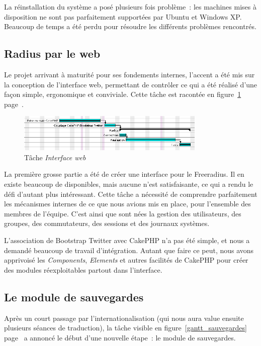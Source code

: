 La réinstallation du système a posé plusieurs fois problème~: les machines mises à disposition ne sont pas parfaitement supportées par Ubuntu et Windows XP. Beaucoup de temps a été perdu pour résoudre les différents problèmes rencontrés.

\subsection{Radius par le web}

Le projet arrivant à maturité pour ses fondements internes, l'accent a été mis sur la conception de l'interface web, permettant de contrôler ce qui a été réalisé d'une façon simple, ergonomique et conviviale. Cette tâche est racontée en figure~\ref{gantt_cake} page~\pageref{gantt_cake}.

\begin{figure}[!h]
	\begin{center}
		\includegraphics[width=0.8\textwidth]{img/gantt_cake.png}
	\end{center}
	\caption{Tâche \textit{Interface web}}
	\label{gantt_cake}
\end{figure}

La première grosse partie a été de créer une interface pour le Freeradius. Il en existe beaucoup de disponibles, mais aucune n'est satisfaisante, ce qui a rendu le défi d'autant plus intéressant. Cette tâche a nécessité de comprendre parfaitement les mécanismes internes de ce que nous avions mis en place, pour l'ensemble des membres de l'équipe. C'est ainsi que sont nées la gestion des utilisateurs, des groupes, des commutateurs, des sessions et des journaux systèmes.

L'association de Bootstrap Twitter avec CakePHP n'a pas été simple, et nous a demandé beaucoup de travail d'intégration. Autant que faire ce peut, nous avons apprivoisé les \emph{Components}, \emph{Elements} et autres facilités de CakePHP pour créer des modules réexploitables partout dans l'interface.

\subsection{Le module de sauvegardes}

Après un court passage par l'internationalisation (qui nous aura value ensuite plusieurs séances de traduction), la tâche visible en figure~\ref{gantt_sauvegardes} page~\pageref{gantt_sauvegardes} a annoncé le début d'une nouvelle étape~: le module de sauvegardes.

